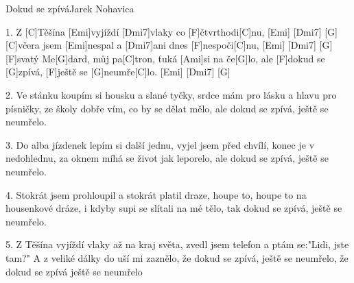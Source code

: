 \begin{song}{Dokud se zpívá}{Jarek Nohavica}

\begin{xverse}{1. }
Z [C]Těšína [Emi]vyjíždí [Dmi7]vlaky co [F]{}čtvrthodi[C]nu, [Emi]{\qquad} [Dmi7]{\qquad} [G]{\qquad}
[C]včera jsem [Emi]nespal a [Dmi7]ani dnes [F]nespoči[C]nu,  [Emi]{\qquad} [Dmi7]{\qquad} [G]{\qquad}
[F]svatý Me[G]dard, můj pa[C]tron, ťuká [Ami]si na če[G]lo,
ale [F]dokud se [G]zpívá, [F]ještě se [G]neumře[C]lo.  [Emi]{\qquad} [Dmi7]{\qquad} [G]{\qquad}
\end{xverse}

\begin{xverse}{2. }
Ve stánku koupím si housku a slané tyčky,
srdce mám pro lásku a hlavu pro písničky,
ze školy dobře vím, co by se dělat mělo,
ale dokud se zpívá, ještě se neumřelo.
\end{xverse}

\begin{xverse}{3. }
Do alba jízdenek lepím si další jednu,
vyjel jsem před chvílí, konec je v nedohlednu,
za oknem míhá se život jak leporelo,
ale dokud se zpívá, ještě se neumřelo.
\end{xverse}

\begin{xverse}{4. }
Stokrát jsem prohloupil a stokrát platil draze,
houpe to, houpe to na housenkové dráze,
i kdyby supi se slítali na mé tělo,
tak dokud se zpívá, ještě se neumřelo.
\end{xverse}

\begin{xverse}{5. }
Z Těšína vyjíždí vlaky až na kraj světa,
zvedl jsem telefon a ptám se:"Lidi, jste tam?"
A z veliké dálky do uší mi zaznělo,
že dokud se zpívá, ještě se neumřelo,
že dokud se zpívá ještě se neumřelo
\end{xverse}

\end{song}
\chords{\chordDmiSeven}

